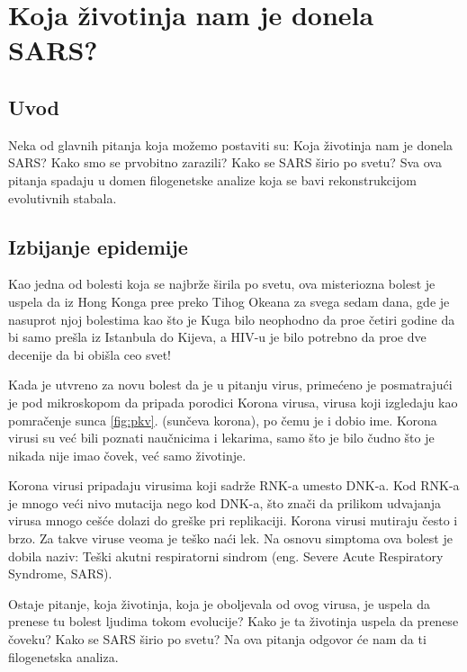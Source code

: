 \chapter{Koja \v{z}ivotinja nam je donela SARS?}
\setbookcodestyle

\section{Uvod}
\label{sec:uvod}

Neka od glavnih pitanja koja mo\v{z}emo postaviti su:
Koja \v{z}ivotinja nam je donela SARS? Kako smo se prvobitno zarazili? Kako se SARS \v{s}irio po svetu? Sva ova pitanja spadaju u domen filogenetske analize koja se bavi rekonstrukcijom evolutivnih stabala.

\section{Izbijanje epidemije}
\label{sec:izbijanjeepidemije}

Kao jedna od bolesti koja se najbr\v{z}e \v{s}irila po svetu, ova misteriozna bolest je uspela da iz Hong Konga pre\dj e preko Tihog Okeana za svega sedam dana, gde je nasuprot njoj bolestima kao \v{s}to je Kuga bilo neophodno da pro\dj e \v{c}etiri godine da bi samo pre\v{s}la iz Istanbula do Kijeva, a HIV-u je bilo potrebno da pro\dj e dve decenije da bi obi\v{s}la ceo svet! 

Kada je utvr\dj eno za novu bolest da je u pitanju virus, prime\'ceno je posmatraju\'ci je pod mikroskopom da pripada porodici Korona virusa, virusa koji izgledaju kao pomra\v{c}enje sunca \ref{fig:pkv}. (sun\v{c}eva korona), po \v{c}emu je i dobio ime. Korona virusi su ve\'c bili poznati nau\v{c}nicima i lekarima, samo \v{s}to je bilo \v{c}udno \v{s}to je nikada nije imao \v{c}ovek, ve\'c samo \v{z}ivotinje. 

Korona virusi pripadaju virusima koji sadr\v{z}e RNK-a umesto DNK-a. Kod RNK-a je mnogo ve\'ci nivo mutacija nego kod DNK-a, \v{s}to zna\v{c}i da prilikom udvajanja virusa mnogo ce\v{s}\'ce dolazi do gre\v{s}ke pri replikaciji. Korona virusi mutiraju često i brzo. Za takve viruse veoma je teško naći lek. Na osnovu simptoma ova bolest je dobila naziv: Te\v{s}ki akutni respiratorni sindrom (eng. Severe Acute Respiratory Syndrome, SARS). 

Ostaje pitanje, koja \v{z}ivotinja, koja je oboljevala od ovog virusa, je uspela da prenese tu bolest ljudima tokom evolucije? Kako je ta životinja uspela da prenese čoveku? Kako se SARS širio po svetu? Na ova pitanja odgovor će nam da ti filogenetska analiza.

